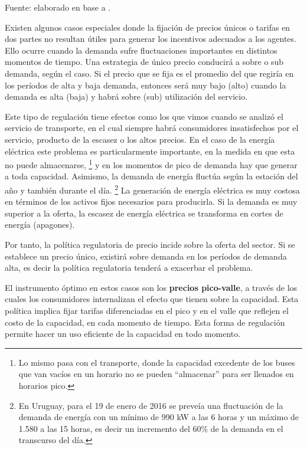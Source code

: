 \documentclass[
  12pt,
  spanish,
]{book}
\begin{document}
Fuente: elaborado en base a \citet{Berg2013}.

Existen algunos casos especiales donde la fijación de precios únicos o
tarifas en dos partes no resultan útiles para generar los incentivos
adecuados a los agentes. Ello ocurre cuando la demanda sufre
fluctuaciones importantes en distintos momentos de tiempo. Una
estrategia de único precio conducirá a sobre o sub demanda, según el
caso. Si el precio que se fija es el promedio del que regiría en los
períodos de alta y baja demanda, entonces será muy bajo (alto) cuando la
demanda es alta (baja) y habrá sobre (sub) utilización del servicio.

Este tipo de regulación tiene efectos como los que vimos cuando se
analizó el servicio de transporte, en el cual siempre habrá consumidores
insatisfechos por el servicio, producto de la escasez o los altos
precios. En el caso de la energía eléctrica este problema es
particularmente importante, en la medida en que esta no puede
almacenarse, \footnote{Lo mismo pasa con el transporte, donde la
  capacidad excedente de los buses que van vacíos en un horario no se
  pueden ``almacenar'' para ser llenados en horarios pico.} y en los
momentos de pico de demanda hay que generar a toda capacidad. Asimismo,
la demanda de energía fluctúa según la estación del año y también
durante el día. \footnote{En Uruguay, para el 19 de enero de 2016 se
  preveía una fluctuación de la demanda de energía con un mínimo de 990
  kW a las 6 horas y un máximo de 1.580 a las 15 horas, es decir un
  incremento del 60\% de la demanda en el transcurso del día.} La
generación de energía eléctrica es muy costosa en términos de los
activos fijos necesarios para producirla. Si la demanda es muy superior
a la oferta, la escasez de energía eléctrica se transforma en cortes de
energía (apagones).

Por tanto, la política regulatoria de precio incide sobre la oferta del
sector. Si se establece un precio único, existirá sobre demanda en los
períodos de demanda alta, es decir la política regulatoria tenderá a
exacerbar el problema.

El instrumento óptimo en estos casos son los \textbf{precios
pico-valle}, a través de los cuales los consumidores internalizan el
efecto que tienen sobre la capacidad. Esta política implica fijar
tarifas diferenciadas en el pico y en el valle que reflejen el costo de
la capacidad, en cada momento de tiempo. Esta forma de regulación
permite hacer un uso eficiente de la capacidad en todo momento.
\end{document}
